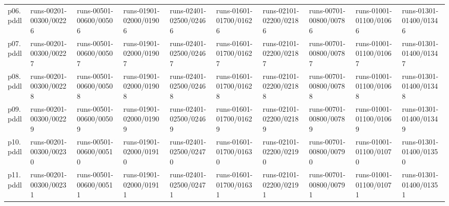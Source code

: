 \documentclass{article}
\begin{document}
\begin{tabular}{@{}lrrrrrrrrr@{}}
p06.pddl & \multicolumn{1}{|l|}{runs-00201-00300/00226} & \multicolumn{1}{|l|}{runs-00501-00600/00506} & \multicolumn{1}{|l|}{runs-01901-02000/01906} & \multicolumn{1}{|l|}{runs-02401-02500/02466} & \multicolumn{1}{|l|}{runs-01601-01700/01626} & \multicolumn{1}{|l|}{runs-02101-02200/02186} & \multicolumn{1}{|l|}{runs-00701-00800/00786} & \multicolumn{1}{|l|}{runs-01001-01100/01066} & \multicolumn{1}{|l|}{runs-01301-01400/01346} \\
p07.pddl & \multicolumn{1}{|l|}{runs-00201-00300/00227} & \multicolumn{1}{|l|}{runs-00501-00600/00507} & \multicolumn{1}{|l|}{runs-01901-02000/01907} & \multicolumn{1}{|l|}{runs-02401-02500/02467} & \multicolumn{1}{|l|}{runs-01601-01700/01627} & \multicolumn{1}{|l|}{runs-02101-02200/02187} & \multicolumn{1}{|l|}{runs-00701-00800/00787} & \multicolumn{1}{|l|}{runs-01001-01100/01067} & \multicolumn{1}{|l|}{runs-01301-01400/01347} \\
p08.pddl & \multicolumn{1}{|l|}{runs-00201-00300/00228} & \multicolumn{1}{|l|}{runs-00501-00600/00508} & \multicolumn{1}{|l|}{runs-01901-02000/01908} & \multicolumn{1}{|l|}{runs-02401-02500/02468} & \multicolumn{1}{|l|}{runs-01601-01700/01628} & \multicolumn{1}{|l|}{runs-02101-02200/02188} & \multicolumn{1}{|l|}{runs-00701-00800/00788} & \multicolumn{1}{|l|}{runs-01001-01100/01068} & \multicolumn{1}{|l|}{runs-01301-01400/01348} \\
p09.pddl & \multicolumn{1}{|l|}{runs-00201-00300/00229} & \multicolumn{1}{|l|}{runs-00501-00600/00509} & \multicolumn{1}{|l|}{runs-01901-02000/01909} & \multicolumn{1}{|l|}{runs-02401-02500/02469} & \multicolumn{1}{|l|}{runs-01601-01700/01629} & \multicolumn{1}{|l|}{runs-02101-02200/02189} & \multicolumn{1}{|l|}{runs-00701-00800/00789} & \multicolumn{1}{|l|}{runs-01001-01100/01069} & \multicolumn{1}{|l|}{runs-01301-01400/01349} \\
p10.pddl & \multicolumn{1}{|l|}{runs-00201-00300/00230} & \multicolumn{1}{|l|}{runs-00501-00600/00510} & \multicolumn{1}{|l|}{runs-01901-02000/01910} & \multicolumn{1}{|l|}{runs-02401-02500/02470} & \multicolumn{1}{|l|}{runs-01601-01700/01630} & \multicolumn{1}{|l|}{runs-02101-02200/02190} & \multicolumn{1}{|l|}{runs-00701-00800/00790} & \multicolumn{1}{|l|}{runs-01001-01100/01070} & \multicolumn{1}{|l|}{runs-01301-01400/01350} \\
p11.pddl & \multicolumn{1}{|l|}{runs-00201-00300/00231} & \multicolumn{1}{|l|}{runs-00501-00600/00511} & \multicolumn{1}{|l|}{runs-01901-02000/01911} & \multicolumn{1}{|l|}{runs-02401-02500/02471} & \multicolumn{1}{|l|}{runs-01601-01700/01631} & \multicolumn{1}{|l|}{runs-02101-02200/02191} & \multicolumn{1}{|l|}{runs-00701-00800/00791} & \multicolumn{1}{|l|}{runs-01001-01100/01071} & \multicolumn{1}{|l|}{runs-01301-01400/01351} \\

\end{tabular}
\end{document}
